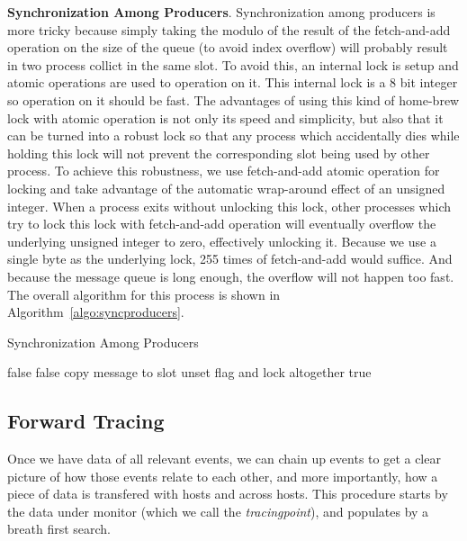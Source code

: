 \documentclass[letterpaper,twocolumn,10pt]{article}
\begin{document}
\noindent
\textbf{Synchronization Among Producers}. Synchronization among producers is
more tricky because simply taking the modulo of the result of the
fetch-and-add operation on the size of the queue (to avoid index overflow)
will probably result in two process collict in the same slot. To avoid this,
an internal lock is setup and atomic operations are used to operation on it.
This internal lock is a 8 bit integer so operation on it should be fast. The
advantages of using this kind of home-brew lock with atomic operation is not
only its speed and simplicity, but also that it can be turned into a robust
lock so that any process which accidentally dies while holding this lock will
not prevent the corresponding slot being used by other process. To achieve
this robustness, we use fetch-and-add atomic operation for locking and take
advantage of the automatic wrap-around effect of an unsigned integer. When a
process exits without unlocking this lock, other processes which try to lock
this lock with fetch-and-add operation will eventually overflow the
underlying unsigned integer to zero, effectively unlocking it. Because we use
a single byte as the underlying lock, 255 times of fetch-and-add would
suffice. And because the message queue is long enough, the overflow will not
happen too fast. The overall algorithm for this process is shown in
Algorithm~\ref{algo:syncproducers}.

\let\oldReturn\Return
\renewcommand{\Return}{\State\oldReturn}
\begin{algorithm}
\caption{Synchronization Among Producers}\label{algo:syncproducers}
\begin{algorithmic}[1]     %
     \Return false \EndIf
     \Return false \EndIf
    \State copy message to slot
    \State unset flag and lock altogether
    \Return true
\EndProcedure
\end{algorithmic}
\end{algorithm}


\subsection{Forward Tracing} \label{sec:fwtracing}

Once we have data of all relevant events, we can chain up events to get a
clear picture of how those events relate to each other, and more importantly,
how a piece of data is transfered with hosts and across hosts.  This procedure
starts by the data under monitor (which we call the \textit{tracingpoint}),
and populates by a breath first search.
\end{document}
